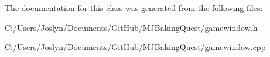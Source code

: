 The documentation for this class was generated from the following files\-:\begin{DoxyCompactItemize}
\item 
C\-:/\-Users/\-Joslyn/\-Documents/\-Git\-Hub/\-M\-J\-Baking\-Quest/gamewindow.\-h\item 
C\-:/\-Users/\-Joslyn/\-Documents/\-Git\-Hub/\-M\-J\-Baking\-Quest/gamewindow.\-cpp\end{DoxyCompactItemize}

